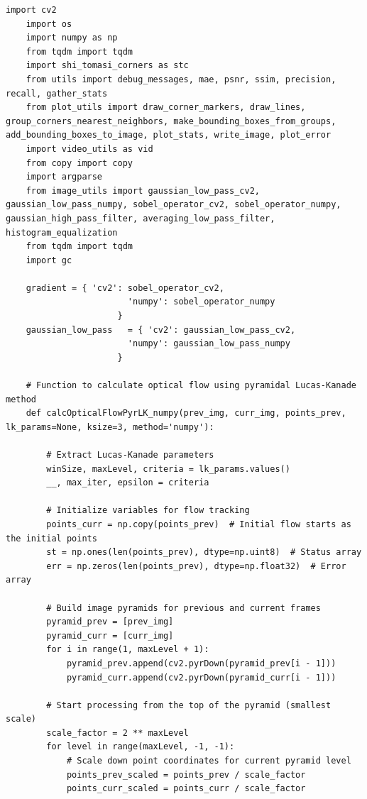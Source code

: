 \documentclass[11pt, conference, letterpaper]{IEEEtran}
\begin{document}
\begin{lstlisting}[style=python, caption={\texttt{lucas\_kanade.py}}, label={lst:lk}]
    import cv2
    import os
    import numpy as np
    from tqdm import tqdm
    import shi_tomasi_corners as stc
    from utils import debug_messages, mae, psnr, ssim, precision, recall, gather_stats
    from plot_utils import draw_corner_markers, draw_lines, group_corners_nearest_neighbors, make_bounding_boxes_from_groups, add_bounding_boxes_to_image, plot_stats, write_image, plot_error
    import video_utils as vid
    from copy import copy
    import argparse
    from image_utils import gaussian_low_pass_cv2, gaussian_low_pass_numpy, sobel_operator_cv2, sobel_operator_numpy, gaussian_high_pass_filter, averaging_low_pass_filter, histogram_equalization
    from tqdm import tqdm
    import gc
    
    gradient = { 'cv2': sobel_operator_cv2,
                        'numpy': sobel_operator_numpy
                      }
    gaussian_low_pass   = { 'cv2': gaussian_low_pass_cv2,
                        'numpy': gaussian_low_pass_numpy
                      }
    
    # Function to calculate optical flow using pyramidal Lucas-Kanade method
    def calcOpticalFlowPyrLK_numpy(prev_img, curr_img, points_prev, lk_params=None, ksize=3, method='numpy'):
    
        # Extract Lucas-Kanade parameters
        winSize, maxLevel, criteria = lk_params.values()
        __, max_iter, epsilon = criteria
        
        # Initialize variables for flow tracking
        points_curr = np.copy(points_prev)  # Initial flow starts as the initial points
        st = np.ones(len(points_prev), dtype=np.uint8)  # Status array
        err = np.zeros(len(points_prev), dtype=np.float32)  # Error array
    
        # Build image pyramids for previous and current frames
        pyramid_prev = [prev_img]
        pyramid_curr = [curr_img]
        for i in range(1, maxLevel + 1):
            pyramid_prev.append(cv2.pyrDown(pyramid_prev[i - 1]))
            pyramid_curr.append(cv2.pyrDown(pyramid_curr[i - 1]))
    
        # Start processing from the top of the pyramid (smallest scale)
        scale_factor = 2 ** maxLevel
        for level in range(maxLevel, -1, -1):
            # Scale down point coordinates for current pyramid level
            points_prev_scaled = points_prev / scale_factor
            points_curr_scaled = points_curr / scale_factor
    

\end{lstlisting}
\end{document}
